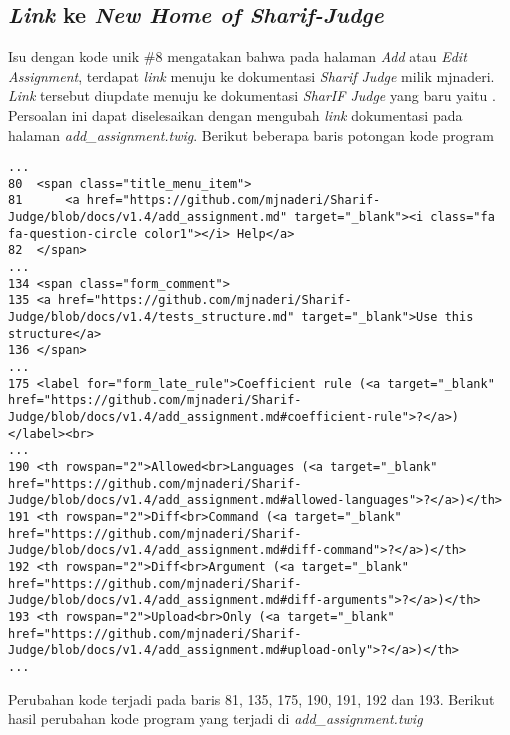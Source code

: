 	\subsection{\textit{Link} ke \textit{New Home of Sharif-Judge}}
	Isu dengan kode unik \#8 mengatakan bahwa pada halaman \textit{Add} atau \textit{Edit Assignment}, terdapat \textit{link} menuju ke dokumentasi \textit{Sharif Judge} milik mjnaderi. \textit{Link} tersebut diupdate menuju ke dokumentasi \textit{SharIF Judge} yang baru yaitu . Persoalan ini dapat diselesaikan dengan mengubah \textit{link} dokumentasi pada halaman \textit{add\_assignment.twig}. Berikut beberapa baris potongan kode program
\begin{lstlisting}[basicstyle=\ttfamily, frame=single,
columns=fullflexible, keepspaces=true, breaklines=true]
...
80	<span class="title_menu_item">
81		<a href="https://github.com/mjnaderi/Sharif-Judge/blob/docs/v1.4/add_assignment.md" target="_blank"><i class="fa fa-question-circle color1"></i> Help</a>
82	</span>
...
134	<span class="form_comment">
135	<a href="https://github.com/mjnaderi/Sharif-Judge/blob/docs/v1.4/tests_structure.md" target="_blank">Use this structure</a>
136	</span>
...
175	<label for="form_late_rule">Coefficient rule (<a target="_blank" href="https://github.com/mjnaderi/Sharif-Judge/blob/docs/v1.4/add_assignment.md#coefficient-rule">?</a>)</label><br>
...
190	<th rowspan="2">Allowed<br>Languages (<a target="_blank" href="https://github.com/mjnaderi/Sharif-Judge/blob/docs/v1.4/add_assignment.md#allowed-languages">?</a>)</th>
191	<th rowspan="2">Diff<br>Command (<a target="_blank" href="https://github.com/mjnaderi/Sharif-Judge/blob/docs/v1.4/add_assignment.md#diff-command">?</a>)</th>
192	<th rowspan="2">Diff<br>Argument (<a target="_blank" href="https://github.com/mjnaderi/Sharif-Judge/blob/docs/v1.4/add_assignment.md#diff-arguments">?</a>)</th>
193	<th rowspan="2">Upload<br>Only (<a target="_blank" href="https://github.com/mjnaderi/Sharif-Judge/blob/docs/v1.4/add_assignment.md#upload-only">?</a>)</th>
...
\end{lstlisting}
	Perubahan kode terjadi pada baris 81, 135, 175, 190, 191, 192 dan 193. Berikut hasil perubahan kode program yang terjadi di \textit{add\_assignment.twig}
